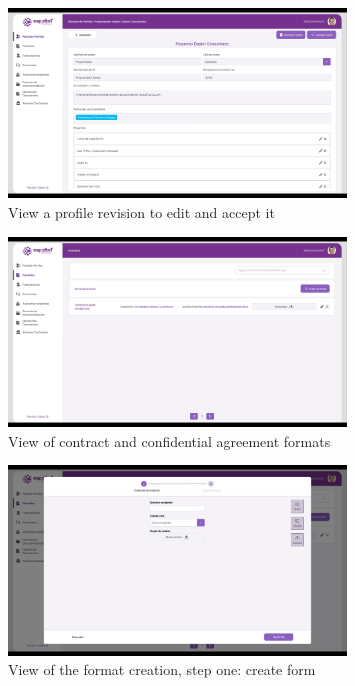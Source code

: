 \documentclass{scrreprt}
\begin{document}
\begin{figure}[H]
	\centering \small
	\includegraphics[width=0.8\textwidth]{WebPrototype/wflow-23.jpeg}
	\caption{View a profile revision to edit and accept it}
\end{figure}

\begin{figure}[H]
	\centering \small
	\includegraphics[width=0.8\textwidth]{WebPrototype/wflow-24.jpeg}
	\caption{View of contract and confidential agreement formats}
\end{figure}

\begin{figure}[H]
	\centering \small
	\includegraphics[width=0.8\textwidth]{WebPrototype/wflow-25.jpeg}
	\caption{View of the format creation, step one: create form}
\end{figure}
\end{document}
